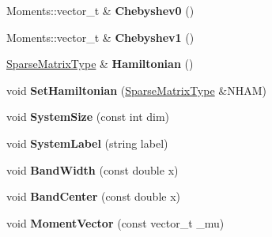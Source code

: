 \begin{DoxyCompactItemize}
\item 
Moments\+::vector\+\_\+t \& {\bfseries Chebyshev0} ()\hypertarget{classchebyshev_1_1_moments_a8634f3562b8c6544397052413d74ecec}{}\label{classchebyshev_1_1_moments_a8634f3562b8c6544397052413d74ecec}

\item 
Moments\+::vector\+\_\+t \& {\bfseries Chebyshev1} ()\hypertarget{classchebyshev_1_1_moments_ab8b932b90a33e13756cadab8c448474b}{}\label{classchebyshev_1_1_moments_ab8b932b90a33e13756cadab8c448474b}

\item 
\hyperlink{class_sparse_matrix_type}{Sparse\+Matrix\+Type} \& {\bfseries Hamiltonian} ()\hypertarget{classchebyshev_1_1_moments_a0deae44c3529c12e14954708f7f5c712}{}\label{classchebyshev_1_1_moments_a0deae44c3529c12e14954708f7f5c712}

\item 
void {\bfseries Set\+Hamiltonian} (\hyperlink{class_sparse_matrix_type}{Sparse\+Matrix\+Type} \&N\+H\+AM)\hypertarget{classchebyshev_1_1_moments_aed05965de8ad9b2dfa4a6c459284ec09}{}\label{classchebyshev_1_1_moments_aed05965de8ad9b2dfa4a6c459284ec09}

\item 
void {\bfseries System\+Size} (const int dim)\hypertarget{classchebyshev_1_1_moments_a27f760f321dea8f7deaee3bd860ae1b9}{}\label{classchebyshev_1_1_moments_a27f760f321dea8f7deaee3bd860ae1b9}

\item 
void {\bfseries System\+Label} (string label)\hypertarget{classchebyshev_1_1_moments_af0e626b9f966c5fd817cbb4ed20b86fb}{}\label{classchebyshev_1_1_moments_af0e626b9f966c5fd817cbb4ed20b86fb}

\item 
void {\bfseries Band\+Width} (const double x)\hypertarget{classchebyshev_1_1_moments_a2537cf25e77630a6f791bfac3eefe433}{}\label{classchebyshev_1_1_moments_a2537cf25e77630a6f791bfac3eefe433}

\item 
void {\bfseries Band\+Center} (const double x)\hypertarget{classchebyshev_1_1_moments_adf3725c46548cb60a20d4164ee20845d}{}\label{classchebyshev_1_1_moments_adf3725c46548cb60a20d4164ee20845d}

\item 
void {\bfseries Moment\+Vector} (const vector\+\_\+t \+\_\+mu)\hypertarget{classchebyshev_1_1_moments_a2f91986d82de1f85e5fc252440749872}{}\label{classchebyshev_1_1_moments_a2f91986d82de1f85e5fc252440749872}


\end{DoxyCompactItemize}
